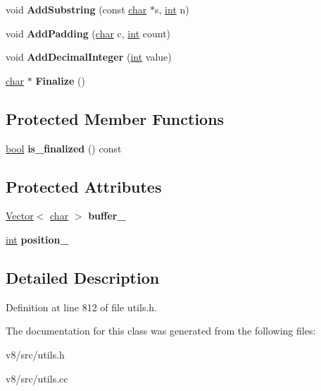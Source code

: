 \begin{DoxyCompactItemize}
void {\bfseries Add\+Substring} (const \mbox{\hyperlink{classchar}{char}} $\ast$s, \mbox{\hyperlink{classint}{int}} n)
\item 
\mbox{\label{classv8_1_1internal_1_1SimpleStringBuilder_a550e57aa8ec2df7143c5e864b6ae5402}} 
void {\bfseries Add\+Padding} (\mbox{\hyperlink{classchar}{char}} c, \mbox{\hyperlink{classint}{int}} count)
\item 
\mbox{\label{classv8_1_1internal_1_1SimpleStringBuilder_a169f40e57341232ced1e8ac1e23fdbad}} 
void {\bfseries Add\+Decimal\+Integer} (\mbox{\hyperlink{classint}{int}} value)
\item 
\mbox{\label{classv8_1_1internal_1_1SimpleStringBuilder_ab6aebcff188bdab258d9c139e29543e4}} 
\mbox{\hyperlink{classchar}{char}} $\ast$ {\bfseries Finalize} ()
\end{DoxyCompactItemize}
\subsection*{Protected Member Functions}
\begin{DoxyCompactItemize}
\item 
\mbox{\label{classv8_1_1internal_1_1SimpleStringBuilder_a6021086a5e9f2ce467aca259ff4f479d}} 
\mbox{\hyperlink{classbool}{bool}} {\bfseries is\+\_\+finalized} () const
\end{DoxyCompactItemize}
\subsection*{Protected Attributes}
\begin{DoxyCompactItemize}
\item 
\mbox{\label{classv8_1_1internal_1_1SimpleStringBuilder_a2e7d92b54792ab26c3bff5f96de202fc}} 
\mbox{\hyperlink{classv8_1_1internal_1_1Vector}{Vector}}$<$ \mbox{\hyperlink{classchar}{char}} $>$ {\bfseries buffer\+\_\+}
\item 
\mbox{\label{classv8_1_1internal_1_1SimpleStringBuilder_a0deafc31ecda5d1800219fc4232565c5}} 
\mbox{\hyperlink{classint}{int}} {\bfseries position\+\_\+}
\end{DoxyCompactItemize}


\subsection{Detailed Description}


Definition at line 812 of file utils.\+h.



The documentation for this class was generated from the following files\+:\begin{DoxyCompactItemize}
\item 
v8/src/utils.\+h\item 
v8/src/utils.\+cc\end{DoxyCompactItemize}
